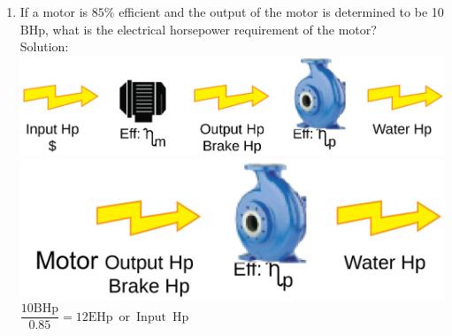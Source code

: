 \documentclass{article}
\begin{document}
\begin{enumerate}
\item If a motor is $85 \%$ efficient and the output of the motor is determined to be 10
$\mathrm{BHp}$, what is the electrical horsepower requirement of the motor?\\
  \vspace{0.2cm}
Solution:\\
 \vspace{0.4cm}\includegraphics[scale=0.08]{PumpProblem}\\
 \vspace{0.2cm}
 \includegraphics[scale=0.32]{PumpingProblemPump}
 \vspace{0.2cm}
$\dfrac{10 \mathrm{BHp}}{0.85}=\boxed{12 \mathrm{EHp \enspace or \enspace Input \enspace Hp}}$
 \vspace{0.4cm}
 

\end{enumerate}
\end{document}

